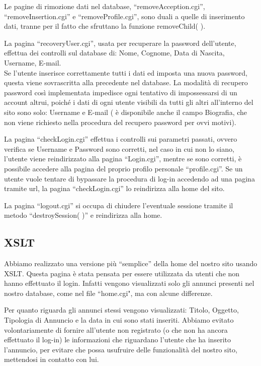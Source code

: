 \documentclass[12pt]{article}
\begin{document}
Le pagine di rimozione dati nel database, “removeAcception.cgi”, “removeInsertion.cgi” e “removeProfile.cgi”, sono duali a quelle di inserimento dati, tranne per il fatto che sfruttano la funzione removeChild( ).

La pagina “recoveryUser.cgi”, usata per recuperare la password dell’utente, effettua dei controlli sul database di:
Nome, Cognome, Data di Nascita, Username, E-mail.\\
Se l’utente inserisce correttamente tutti i dati ed imposta una nuova password, questa viene sovrascritta alla precedente nel database. La modalità di recupero password così implementata impedisce ogni tentativo di impossessarsi di un account altrui, poiché i dati di ogni utente visibili da tutti gli altri all’interno del sito sono solo: Username e E-mail ( è disponibile anche il campo Biografia, che non viene richiesto nella procedura del recupero password per ovvi motivi).

La pagina “checkLogin.cgi” effettua i controlli sui parametri passati, ovvero verifica se Username e Password sono corretti, nel caso in cui non lo siano, l’utente viene reindirizzato alla pagina “Login.cgi”, mentre se sono corretti, è possibile accedere alla pagina del proprio profilo personale “profile.cgi”. Se un utente vuole tentare di bypassare la procedura di log-in accedendo ad una pagina tramite url, la pagina “checkLogin.cgi” lo reindirizza alla home del sito.

La pagina “logout.cgi” si occupa di chiudere l’eventuale sessione tramite il metodo “destroySession( )” e reindirizza alla home.
	
	\subsection{XSLT}
	
	Abbiamo realizzato una versione più “semplice” della home del nostro sito usando XSLT. Questa pagina è stata pensata per essere utilizzata da utenti che non hanno effettuato il login. Infatti vengono visualizzati solo gli annunci presenti nel nostro database, come nel file “home.cgi", ma con alcune differenze.

Per quanto riguarda gli annunci stessi vengono visualizzati: Titolo, Oggetto, Tipologia di Annuncio e la data in cui sono stati inseriti. Abbiamo evitato volontariamente di fornire all’utente non registrato (o che non ha ancora effettuato il log-in) le informazioni che riguardano l’utente che ha inserito l’annuncio, per evitare che possa usufruire delle funzionalità del nostro sito, mettendosi in contatto con lui.
\end{document}
